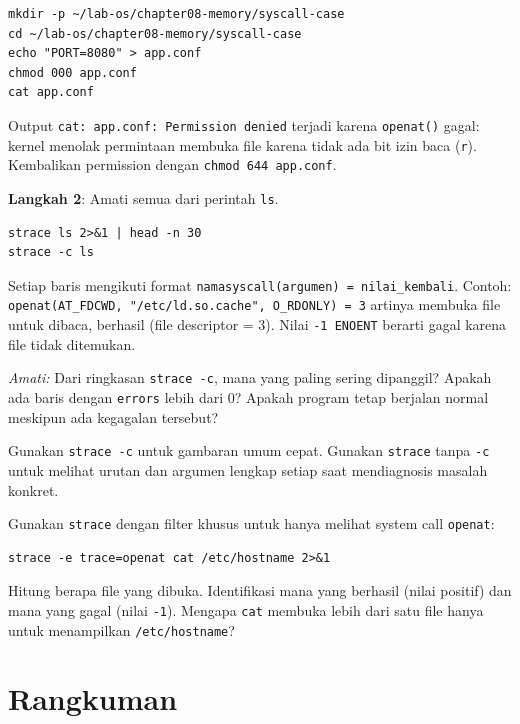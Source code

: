 \begin{lstlisting}[caption={Simulasi permission error}]
mkdir -p ~/lab-os/chapter08-memory/syscall-case
cd ~/lab-os/chapter08-memory/syscall-case
echo "PORT=8080" > app.conf
chmod 000 app.conf
cat app.conf
\end{lstlisting}

Output \texttt{cat: app.conf: Permission denied} terjadi karena 
\texttt{openat()} gagal: kernel menolak permintaan membuka file karena tidak ada
bit izin baca (\texttt{r}). Kembalikan permission dengan \texttt{chmod 644 app.conf}.

\textbf{Langkah 2}: Amati semua  dari perintah \texttt{ls}.

\begin{lstlisting}[caption={Detail dan Ringkasan System Call}]
strace ls 2>&1 | head -n 30
strace -c ls
\end{lstlisting}

Setiap baris mengikuti format \texttt{namasyscall(argumen) = nilai\_kembali}.
Contoh: \texttt{openat(AT\_FDCWD, "/etc/ld.so.cache", O\_RDONLY) = 3} artinya
membuka file untuk dibaca, berhasil (file descriptor = 3). Nilai \texttt{-1 ENOENT}
berarti gagal karena file tidak ditemukan.

\textit{Amati:} Dari ringkasan \texttt{strace -c},  mana yang paling
sering dipanggil? Apakah ada baris dengan \texttt{errors} lebih dari 0? Apakah
program tetap berjalan normal meskipun ada kegagalan tersebut?

\begin{tipbox}
Gunakan \texttt{strace -c} untuk gambaran umum cepat. Gunakan \texttt{strace} tanpa
\texttt{-c} untuk melihat urutan dan argumen lengkap setiap  saat
mendiagnosis masalah konkret.
\end{tipbox}

\begin{challengebox}
Gunakan \texttt{strace} dengan filter khusus untuk hanya melihat system call
\texttt{openat}:
\begin{lstlisting}
strace -e trace=openat cat /etc/hostname 2>&1
\end{lstlisting}
Hitung berapa file yang dibuka. Identifikasi mana yang berhasil (nilai positif)
dan mana yang gagal (nilai \texttt{-1}). Mengapa \texttt{cat} membuka lebih
dari satu file hanya untuk menampilkan \texttt{/etc/hostname}?
\end{challengebox}

\section{Rangkuman}

